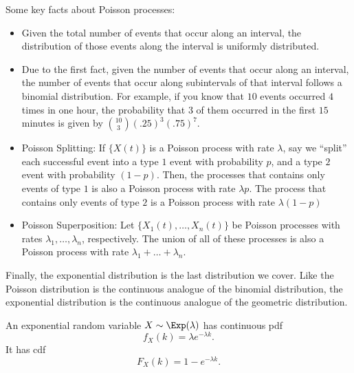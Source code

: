 Some key facts about Poisson processes: 
\begin{itemize}
    \item Given the total number of events that occur along an interval, the distribution of those events along the interval is uniformly distributed. 
    \item Due to the first fact, given the number of events that occur along an interval, the number of events that occur along subintervals of that interval follows a binomial distribution. For example, if you know that $10$ events occurred $4$ times in one hour, the probability that $3$ of them occurred in the first $15$ minutes is given by $\binom{10}{3}(.25)^3(.75)^{7}$. 
    \item \ac{Poisson Splitting}: If $\{X(t)\}$ is a Poisson process with rate $\lambda$, say we ``split'' each successful event into a type $1$ event with probability $p$, and a type $2$ event with probability $(1-p)$. Then, the processes that contains only events of type $1$ is also a Poisson process with rate $\lambda p$. The process that contains only events of type $2$ is a Poisson process with rate $\lambda (1-p)$
    \item \ac{Poisson Superposition}: Let $\{X_1(t), \hdots, X_n(t)\}$ be Poisson processes with rates $\lambda_1, \hdots, \lambda_n$, respectively. The union of all of these processes is also a Poisson process with rate $\lambda_1+\hdots + \lambda_n$. 
\end{itemize}

Finally, the exponential distribution is the last distribution we cover. Like the Poisson distribution is the continuous analogue of the binomial distribution, the exponential distribution is the continuous analogue of the geometric distribution. 

\begin{definition}

An exponential random variable $X\sim \Exp(\lambda)$ has continuous pdf 
\[f_X(k) = \lambda e^{-\lambda k}.\]
It has cdf
\[F_X(k) = 1-e^{-\lambda k}.\]
\end{definition}



